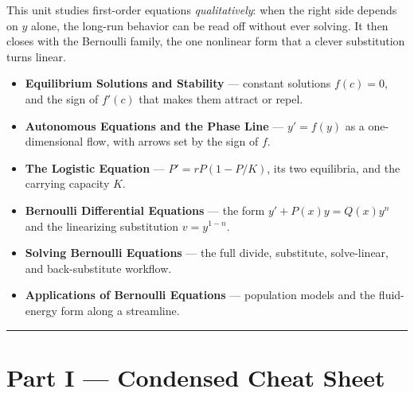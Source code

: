 \begin{topicsbox}
This unit studies first-order equations \emph{qualitatively}: when the right
side depends on $y$ alone, the long-run behavior can be read off without ever
solving. It then closes with the Bernoulli family, the one nonlinear form that a
clever substitution turns linear.
\begin{itemize}[leftmargin=1.4em, itemsep=3pt]
    \item \textbf{Equilibrium Solutions and Stability} --- constant solutions
          $f(c)=0$, and the sign of $f'(c)$ that makes them attract or repel.
    \item \textbf{Autonomous Equations and the Phase Line} --- $y'=f(y)$ as a
          one-dimensional flow, with arrows set by the sign of $f$.
    \item \textbf{The Logistic Equation} --- $P'=rP(1-P/K)$, its two equilibria,
          and the carrying capacity $K$.
    \item \textbf{Bernoulli Differential Equations} --- the form
          $y'+P(x)y=Q(x)y^{n}$ and the linearizing substitution $v=y^{1-n}$.
    \item \textbf{Solving Bernoulli Equations} --- the full divide, substitute,
          solve-linear, and back-substitute workflow.
    \item \textbf{Applications of Bernoulli Equations} --- population models and
          the fluid-energy form along a streamline.
\end{itemize}
\end{topicsbox}

\vspace{0.6em}
\hrule
\vspace{0.6em}

{}
\section*{Part I --- Condensed Cheat Sheet}
\setcounter{section}{4}   %


